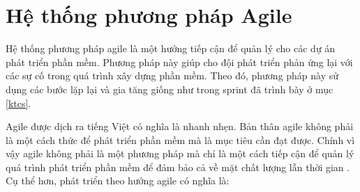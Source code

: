\documentclass{article}
\begin{document}
\section{Hệ thống phương pháp Agile}

Hệ thống phương pháp agile là một hướng tiếp cận để quản lý cho các dự án phát triển phần mềm. Phương pháp này giúp cho đội phát triển phản ứng lại với các sự cố trong quá trình xây dựng phần mềm. Theo đó, phương pháp này sử dụng các bước lặp lại và gia tăng giống như trong sprint đã trình bày ở mục \ref{ktcs}. 

Agile được dịch ra tiếng Việt có nghĩa là nhanh nhẹn. Bản thân agile không phải là một cách thức để phát triển phần mềm mà là mục tiêu cần đạt được. Chính vì vậy agile không phải là một phương pháp mà chỉ là một cách tiếp cận để quản lý quá trình phát triển phần mềm để đảm bảo cả về mặt chất lượng lẫn thời gian \cite{wisdomjobs}. Cụ thể hơn, phát triển theo hướng agile có nghĩa là:
\end{document}
